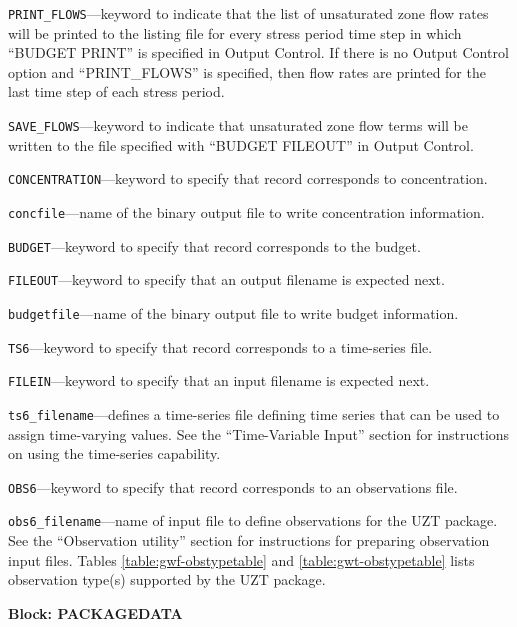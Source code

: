 \begin{description}
\item \texttt{PRINT\_FLOWS}---keyword to indicate that the list of unsaturated zone flow rates will be printed to the listing file for every stress period time step in which ``BUDGET PRINT'' is specified in Output Control.  If there is no Output Control option and ``PRINT\_FLOWS'' is specified, then flow rates are printed for the last time step of each stress period.

\item \texttt{SAVE\_FLOWS}---keyword to indicate that unsaturated zone flow terms will be written to the file specified with ``BUDGET FILEOUT'' in Output Control.

\item \texttt{CONCENTRATION}---keyword to specify that record corresponds to concentration.

\item \texttt{concfile}---name of the binary output file to write concentration information.

\item \texttt{BUDGET}---keyword to specify that record corresponds to the budget.

\item \texttt{FILEOUT}---keyword to specify that an output filename is expected next.

\item \texttt{budgetfile}---name of the binary output file to write budget information.

\item \texttt{TS6}---keyword to specify that record corresponds to a time-series file.

\item \texttt{FILEIN}---keyword to specify that an input filename is expected next.

\item \texttt{ts6\_filename}---defines a time-series file defining time series that can be used to assign time-varying values. See the ``Time-Variable Input'' section for instructions on using the time-series capability.

\item \texttt{OBS6}---keyword to specify that record corresponds to an observations file.

\item \texttt{obs6\_filename}---name of input file to define observations for the UZT package. See the ``Observation utility'' section for instructions for preparing observation input files. Tables \ref{table:gwf-obstypetable} and \ref{table:gwt-obstypetable} lists observation type(s) supported by the UZT package.

\end{description}
\item \textbf{Block: PACKAGEDATA}

